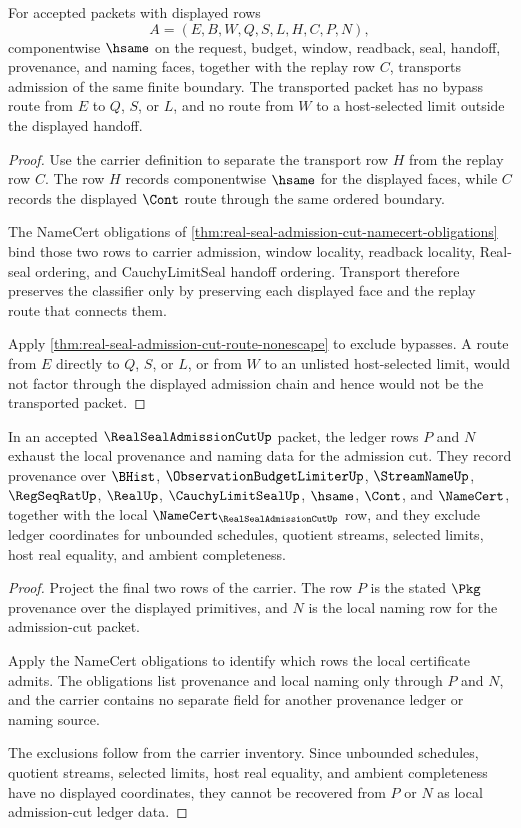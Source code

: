 \begin{theorem}
\label{thm:real-seal-admission-cut-classifier-transport}
For accepted packets with displayed rows
$$
A=(E,B,W,Q,S,L,H,C,P,N),
$$
componentwise $\hsame$ on the request, budget, window, readback, seal, handoff, provenance, and naming faces, together with the replay row $C$, transports admission of the same finite boundary. The transported packet has no bypass route from $E$ to $Q$, $S$, or $L$, and no route from $W$ to a host-selected limit outside the displayed handoff.
\end{theorem}
\begin{proof}
Use the carrier definition to separate the transport row $H$ from the replay row $C$. The row $H$ records componentwise $\hsame$ for the displayed faces, while $C$ records the displayed $\Cont$ route through the same ordered boundary.

The NameCert obligations of \autoref{thm:real-seal-admission-cut-namecert-obligations} bind those two rows to carrier admission, window locality, readback locality, Real-seal ordering, and CauchyLimitSeal handoff ordering. Transport therefore preserves the classifier only by preserving each displayed face and the replay route that connects them.

Apply \autoref{thm:real-seal-admission-cut-route-nonescape} to exclude bypasses. A route from $E$ directly to $Q$, $S$, or $L$, or from $W$ to an unlisted host-selected limit, would not factor through the displayed admission chain and hence would not be the transported packet.
\end{proof}

\begin{theorem}
\label{thm:real-seal-admission-cut-ledger-exactness}
In an accepted $\RealSealAdmissionCutUp$ packet, the ledger rows $P$ and $N$ exhaust the local provenance and naming data for the admission cut. They record provenance over $\BHist$, $\ObservationBudgetLimiterUp$, $\StreamNameUp$, $\RegSeqRatUp$, $\RealUp$, $\CauchyLimitSealUp$, $\hsame$, $\Cont$, and $\NameCert$, together with the local $\NameCert_{\RealSealAdmissionCutUp}$ row, and they exclude ledger coordinates for unbounded schedules, quotient streams, selected limits, host real equality, and ambient completeness.
\end{theorem}
\begin{proof}
Project the final two rows of the carrier. The row $P$ is the stated $\Pkg$ provenance over the displayed primitives, and $N$ is the local naming row for the admission-cut packet.

Apply the NameCert obligations to identify which rows the local certificate admits. The obligations list provenance and local naming only through $P$ and $N$, and the carrier contains no separate field for another provenance ledger or naming source.

The exclusions follow from the carrier inventory. Since unbounded schedules, quotient streams, selected limits, host real equality, and ambient completeness have no displayed coordinates, they cannot be recovered from $P$ or $N$ as local admission-cut ledger data.
\end{proof}


